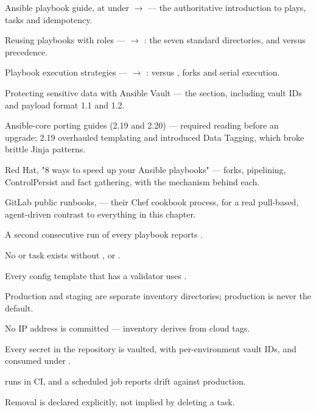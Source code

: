 \begin{wbitem}
  \item Ansible playbook guide, at  under  $\rightarrow$  --- the authoritative introduction to plays, tasks and idempotency.
  \item Reusing playbooks with roles ---  $\rightarrow$ : the seven standard directories, and  versus  precedence.
  \item Playbook execution strategies ---  $\rightarrow$ :  versus , forks and serial execution.
  \item Protecting sensitive data with Ansible Vault --- the  section, including vault IDs and payload format 1.1 and 1.2.
  \item Ansible-core porting guides (2.19 and 2.20) --- required reading before an upgrade; 2.19 overhauled templating and introduced Data Tagging, which broke brittle Jinja patterns.
  \item Red Hat, "8 ways to speed up your Ansible playbooks" --- forks, pipelining, ControlPersist and fact gathering, with the mechanism behind each.
  \item GitLab public runbooks,  --- their Chef cookbook process, for a real pull-based, agent-driven contrast to everything in this chapter.
\end{wbitem}

\begin{checklist}
  \item A second consecutive run of every playbook reports .
  \item No  or  task exists without ,  or .
  \item Every config template that has a validator uses .
  \item Production and staging are separate inventory directories; production is never the default.
  \item No IP address is committed --- inventory derives from cloud tags.
  \item Every secret in the repository is vaulted, with per-environment vault IDs, and consumed under .
  \item {} runs in CI, and a scheduled  job reports drift against production.
  \item Removal is declared explicitly, not implied by deleting a task.
\end{checklist}

